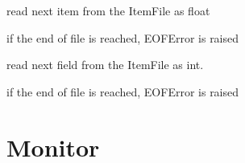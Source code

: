 \documentclass[letterpaper,10pt,english]{sphinxmanual}
\begin{document}
\begin{fulllineitems}
\begin{fulllineitems}
\label{\detokenize{Reference:salabim.ItemFile.read_item_float}}
read next item from the ItemFile as float

if the end of file is reached, EOFError is raised

\end{fulllineitems}


\begin{fulllineitems}
\label{\detokenize{Reference:salabim.ItemFile.read_item_int}}
read next field from the ItemFile as int.

if the end of file is reached, EOFError is raised

\end{fulllineitems}


\end{fulllineitems}



\section{Monitor}
\label{\detokenize{Reference:monitor}}
\end{document}
